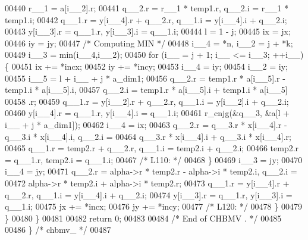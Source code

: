 \begin{DoxyCode}
00440         r\_\_1 = a[i\_\_2].r;
00441         q\_\_2.r = r\_\_1 * temp1.r, q\_\_2.i = r\_\_1 * temp1.i;
00442         q\_\_1.r = y[i\_\_4].r + q\_\_2.r, q\_\_1.i = y[i\_\_4].i + q\_\_2.i;
00443         y[i\_\_3].r = q\_\_1.r, y[i\_\_3].i = q\_\_1.i;
00444         l = 1 - j;
00445         ix = jx;
00446         iy = jy;
00447 \textcolor{comment}{/* Computing MIN */}
00448         i\_\_4 = *n, i\_\_2 = j + *k;
00449         i\_\_3 = min(i\_\_4,i\_\_2);
00450         \textcolor{keywordflow}{for} (i\_\_ = j + 1; i\_\_ <= i\_\_3; ++i\_\_) \{
00451             ix += *incx;
00452             iy += *incy;
00453             i\_\_4 = iy;
00454             i\_\_2 = iy;
00455             i\_\_5 = l + i\_\_ + j * a\_dim1;
00456             q\_\_2.r = temp1.r * a[i\_\_5].r - temp1.i * a[i\_\_5].i, 
00457                 q\_\_2.i = temp1.r * a[i\_\_5].i + temp1.i * a[i\_\_5]
00458                 .r;
00459             q\_\_1.r = y[i\_\_2].r + q\_\_2.r, q\_\_1.i = y[i\_\_2].i + q\_\_2.i;
00460             y[i\_\_4].r = q\_\_1.r, y[i\_\_4].i = q\_\_1.i;
00461             r\_cnjg(&q\_\_3, &a[l + i\_\_ + j * a\_dim1]);
00462             i\_\_4 = ix;
00463             q\_\_2.r = q\_\_3.r * x[i\_\_4].r - q\_\_3.i * x[i\_\_4].i, q\_\_2.i =
00464                  q\_\_3.r * x[i\_\_4].i + q\_\_3.i * x[i\_\_4].r;
00465             q\_\_1.r = temp2.r + q\_\_2.r, q\_\_1.i = temp2.i + q\_\_2.i;
00466             temp2.r = q\_\_1.r, temp2.i = q\_\_1.i;
00467 \textcolor{comment}{/* L110: */}
00468         \}
00469         i\_\_3 = jy;
00470         i\_\_4 = jy;
00471         q\_\_2.r = alpha->r * temp2.r - alpha->i * temp2.i, q\_\_2.i = 
00472             alpha->r * temp2.i + alpha->i * temp2.r;
00473         q\_\_1.r = y[i\_\_4].r + q\_\_2.r, q\_\_1.i = y[i\_\_4].i + q\_\_2.i;
00474         y[i\_\_3].r = q\_\_1.r, y[i\_\_3].i = q\_\_1.i;
00475         jx += *incx;
00476         jy += *incy;
00477 \textcolor{comment}{/* L120: */}
00478         \}
00479     \}
00480     \}
00481 
00482     \textcolor{keywordflow}{return} 0;
00483 
00484 \textcolor{comment}{/*     End of CHBMV . */}
00485 
00486 \} \textcolor{comment}{/* chbmv\_ */}
00487 
\end{DoxyCode}
